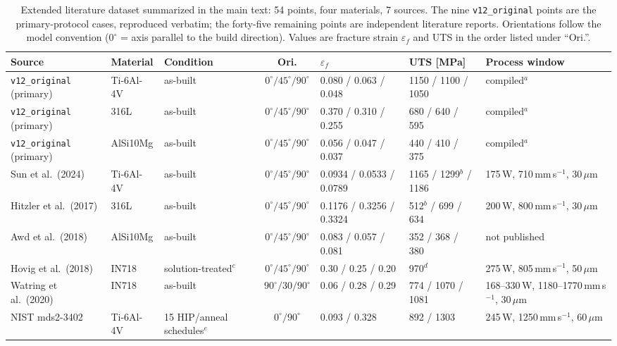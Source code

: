 \documentclass[12pt,a4paper,twocolumn]{article}
\providecommand{\ang}[1]{\ensuremath{#1^{\circ}}}
\begin{document}
\begin{table}[htbp]
\centering
\caption{Extended literature dataset summarized in the main text: 54 points, four materials, 7
sources. The nine \texttt{v12\_original} points are the primary-protocol cases, reproduced verbatim; the
forty-five remaining points are independent literature reports. Orientations follow the model convention
($\ang{0}$ = axis parallel to the build direction). Values are fracture strain $\varepsilon_f$ and UTS in
the order listed under ``Ori.''.}
\label{tab:extended_dataset}
\scriptsize
\setlength{\tabcolsep}{3pt}
\begin{tabular}{p{}p{}p{}cp{}p{}p{}}
\toprule
\textbf{Source} & \textbf{Material} & \textbf{Condition} & \textbf{Ori.} & \textbf{$\varepsilon_f$} & \textbf{UTS [MPa]} & \textbf{Process window} \\
\midrule
\texttt{v12\_original} (primary) & Ti-6Al-4V & as-built & $\ang{0}/\ang{45}/\ang{90}$ & 0.080 / 0.063 / 0.048 & 1150 / 1100 / 1050 & compiled$^{a}$ \\
\texttt{v12\_original} (primary) & 316L & as-built & $\ang{0}/\ang{45}/\ang{90}$ & 0.370 / 0.310 / 0.255 & 680 / 640 / 595 & compiled$^{a}$ \\
\texttt{v12\_original} (primary) & AlSi10Mg & as-built & $\ang{0}/\ang{45}/\ang{90}$ & 0.056 / 0.047 / 0.037 & 440 / 410 / 375 & compiled$^{a}$ \\
Sun et al.\ (2024) & Ti-6Al-4V & as-built & $\ang{0}/\ang{45}/\ang{90}$ & 0.0934 / 0.0533 / 0.0789 & 1165 / 1299$^{b}$ / 1186 & 175\,W, 710\,mm\,s$^{-1}$, 30\,$\mu$m \\
Hitzler et al.\ (2017) & 316L & as-built & $\ang{0}/\ang{45}/\ang{90}$ & 0.1176 / 0.3256 / 0.3324 & 512$^{b}$ / 699 / 634 & 200\,W, 800\,mm\,s$^{-1}$, 30\,$\mu$m \\
Awd et al.\ (2018) & AlSi10Mg & as-built & $\ang{0}/\ang{45}/\ang{90}$ & 0.083 / 0.057 / 0.081 & 352 / 368 / 380 & not published \\
Hovig et al.\ (2018) & IN718 & solution-treated$^{c}$ & $\ang{0}/\ang{45}/\ang{90}$ & 0.30 / 0.25 / 0.20 & 970$^{d}$ & 275\,W, 805\,mm\,s$^{-1}$, 50\,$\mu$m \\
Watring et al.\ (2020) & IN718 & as-built & $\ang{90}/30/\ang{90}$ & 0.06 / 0.28 / 0.29 & 774 / 1070 / 1081 & 168--330\,W, 1180--1770\,mm\,s$^{-1}$, 30\,$\mu$m \\
NIST mds2-3402 & Ti-6Al-4V & 15 HIP/anneal schedules$^{e}$ & $\ang{0}/\ang{90}$ & 0.093 / 0.328 & 892 / 1303 & 245\,W, 1250\,mm\,s$^{-1}$, 60\,$\mu$m \\

\end{tabular}
\end{table}
\end{document}
